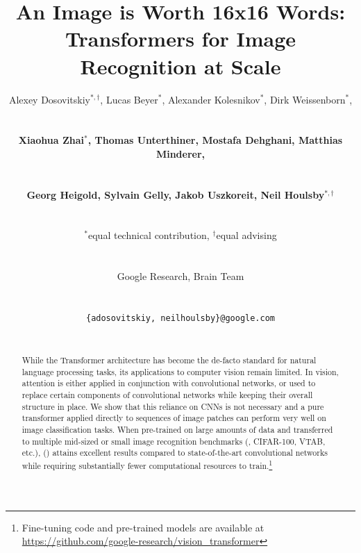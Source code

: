 \title{An Image is Worth 16x16 Words:\\ Transformers for Image Recognition at Scale}


\author{
\centerline{Alexey Dosovitskiy$^{*,\dagger}$, Lucas Beyer$^{*}$, Alexander Kolesnikov$^{*}$, Dirk Weissenborn$^{*}$,} \vspace{1mm}\\
\centerline{\textbf{Xiaohua Zhai$^{*}$, Thomas Unterthiner, Mostafa Dehghani, Matthias Minderer,}} \vspace{0.5mm} \\
\centerline{\textbf{Georg Heigold, Sylvain Gelly, Jakob Uszkoreit, Neil Houlsby$^{*,\dagger}$}} \vspace{0.7mm} \\
\centerline{$^*$equal technical contribution, $^\dagger$equal advising}  \vspace{0.7mm} \\
\centerline{Google Research, Brain Team}  \vspace{0.8mm} \\
\centerline{\texttt{\{adosovitskiy, neilhoulsby\}@google.com}} \\
}


\newcommand{\fix}{\marginpar{FIX}}
\newcommand{\new}{\marginpar{NEW}}

\iclrfinalcopy %



\maketitle

\begin{abstract}
While the Transformer architecture has become the de-facto standard for natural language processing tasks, its applications to computer vision remain limited.
In vision, attention is either applied in conjunction with convolutional networks, or used to replace certain components of convolutional networks while keeping their overall structure in place.
We show that this reliance on CNNs is not necessary and a pure transformer applied directly to sequences of image patches can perform very well on image classification tasks.
When pre-trained on large amounts of data and transferred to multiple mid-sized or small image recognition benchmarks (\imagenet, CIFAR-100, VTAB, etc.), \oursfull{} (\oursabbrv) attains excellent results compared to state-of-the-art convolutional networks while requiring substantially fewer computational resources to train.\footnote{Fine-tuning code and pre-trained models are available at \url{https://github.com/google-research/vision_transformer}}


\end{abstract}


